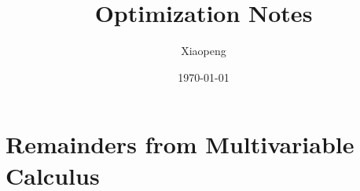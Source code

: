 \documentclass[a4paper, 12pt]{article}
\begin{document}
\title{Optimization Notes}
\author{Xiaopeng}
\date{\today}

\maketitle

\section{Remainders from Multivariable Calculus}

\end{document}
